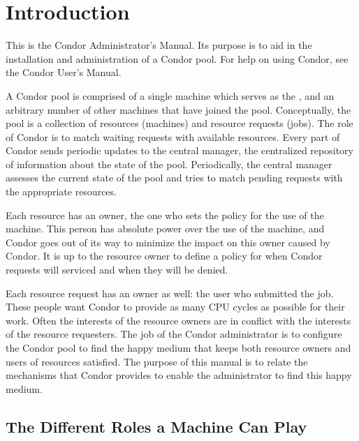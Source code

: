\section{\label{sec:Admin-Intro}Introduction}

This is the Condor Administrator's Manual.
Its purpose is to aid in
the installation and administration of a Condor pool.  For help on
using Condor, see the Condor User's Manual.  

A Condor pool
is comprised of a single machine which serves as the
,
and an arbitrary number of other machines that
have joined the pool.  Conceptually, the pool is a collection of
resources (machines) and resource requests (jobs).  The role of Condor
is to match waiting requests with available resources.  Every part of
Condor sends periodic updates to the central manager, the centralized
repository of information about the state of the pool.  Periodically,
the central manager assesses the current state of the pool and tries
to match pending requests with the appropriate resources.  

Each resource has an owner,
the one who sets the policy for the use of the machine.  This
person has absolute power over the use of the machine,
and Condor goes out
of its way to minimize the impact on this owner caused by Condor.  It
is up to the resource owner to define a policy for when Condor
requests will
serviced and when they will be denied.

Each resource request has an owner as well: the
user who submitted the job.  These people want Condor to provide as
many CPU cycles as possible for their work.  Often the interests of
the resource owners are in conflict with the interests of the resource
requesters.  
The job of the Condor administrator is to configure the Condor pool to
find the happy medium that keeps both resource owners and users of
resources satisfied.  The purpose of this manual is to relate
the mechanisms that Condor provides to enable the administrator to find
this happy medium.

\subsection{\label{sec:Machine-Roles}The Different Roles a Machine Can Play}

